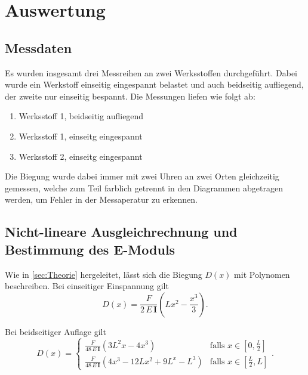 \section{Auswertung}
\label{sec:Auswertung}

\subsection{Messdaten}
\label{sec:Messdaten}
Es wurden insgesamt drei Messreihen an zwei Werksstoffen durchgeführt. Dabei
wurde ein Werkstoff einseitig eingespannt belastet und auch beidseitig aufliegend,
der zweite nur einseitig bespannt. Die Messungen liefen wie folgt ab:
\begin{enumerate}
	\item Werksstoff 1, beidseitig aufliegend
	\item Werksstoff 1, einseitg eingespannt 
	\item Werksstoff 2, einseitg eingespannt 
\end{enumerate}

Die Biegung wurde dabei immer mit zwei Uhren an zwei Orten gleichzeitig 
gemessen, welche zum Teil farblich getrennt in den Diagrammen abgetragen werden,
um Fehler in der Messaperatur zu erkennen.

%
%

\subsection{Nicht-lineare Ausgleichrechnung und Bestimmung des E-Moduls}
Wie in \autoref{sec:Theorie} hergeleitet, lässt sich die Biegung $D(x)$ mit 
Polynomen beschreiben. Bei einseitiger Einspannung gilt
\begin{equation}
	D(x) = \frac{F}{2 \, E \, \mathbf{I}} \left(Lx^2 - \frac{x^3}{3} \right).
	\label{eqn:d_einseitig}
\end{equation}

Bei beidseitiger Auflage gilt
\begin{equation}
	D(x) =
	\begin{cases}
		\frac{F}{48 \, E \, \mathbf{I}}  
		\left( 3L^2x - 4x^3 \right)
		& \text{falls } x \in \left[0, \frac L2 \right] \\
		\frac{F}{48 \, E \, \mathbf{I}}  
		\left( 4x^3 - 12Lx^2 + 9L^x - L^3 \right)
		& \text{falls } x \in \left[ \frac L2, L \right]
	\end{cases}
	.
	\label{eqn:d_beidseitig}
\end{equation}

